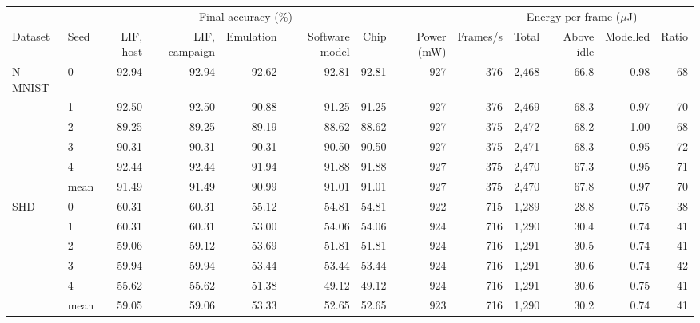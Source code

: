 \begin{tabular*}{\textwidth}{@{\extracolsep{\fill}}llrrrrrrrrrrr@{}}
\toprule
 & & \multicolumn{5}{c}{Final accuracy (\%)} & & & \multicolumn{3}{c}{Energy per frame ($\mu$J)} & \\
\cmidrule(lr){3-7}\cmidrule(lr){10-12}
Dataset & Seed & LIF, host & LIF, campaign & Emulation & Software model & Chip & Power (mW) & Frames/s & Total & Above idle & Modelled & Ratio \\
\midrule
N-MNIST & 0 & 92.94 & 92.94 & 92.62 & 92.81 & 92.81 & 927 & 376 & 2,468 & 66.8 & 0.98 & 68 \\
 & 1 & 92.50 & 92.50 & 90.88 & 91.25 & 91.25 & 927 & 376 & 2,469 & 68.3 & 0.97 & 70 \\
 & 2 & 89.25 & 89.25 & 89.19 & 88.62 & 88.62 & 927 & 375 & 2,472 & 68.2 & 1.00 & 68 \\
 & 3 & 90.31 & 90.31 & 90.31 & 90.50 & 90.50 & 927 & 375 & 2,471 & 68.3 & 0.95 & 72 \\
 & 4 & 92.44 & 92.44 & 91.94 & 91.88 & 91.88 & 927 & 375 & 2,470 & 67.3 & 0.95 & 71 \\
 & mean & 91.49 & 91.49 & 90.99 & 91.01 & 91.01 & 927 & 375 & 2,470 & 67.8 & 0.97 & 70 \\
\midrule
SHD & 0 & 60.31 & 60.31 & 55.12 & 54.81 & 54.81 & 922 & 715 & 1,289 & 28.8 & 0.75 & 38 \\
 & 1 & 60.31 & 60.31 & 53.00 & 54.06 & 54.06 & 924 & 716 & 1,290 & 30.4 & 0.74 & 41 \\
 & 2 & 59.06 & 59.12 & 53.69 & 51.81 & 51.81 & 924 & 716 & 1,291 & 30.5 & 0.74 & 41 \\
 & 3 & 59.94 & 59.94 & 53.44 & 53.44 & 53.44 & 924 & 716 & 1,291 & 30.6 & 0.74 & 42 \\
 & 4 & 55.62 & 55.62 & 51.38 & 49.12 & 49.12 & 924 & 716 & 1,291 & 30.6 & 0.75 & 41 \\
 & mean & 59.05 & 59.06 & 53.33 & 52.65 & 52.65 & 923 & 716 & 1,290 & 30.2 & 0.74 & 41 \\
\bottomrule
\end{tabular*}
